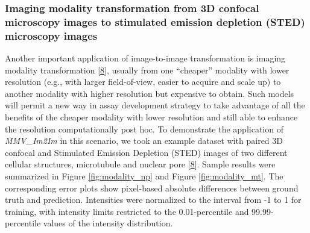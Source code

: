 \hypertarget{imaging-modality-transformation-from-3d-confocal-microscopy-images-to-stimulated-emission-depletion-sted-microscopy-images}{%
\subsubsection{Imaging modality transformation from 3D confocal microscopy images to stimulated emission depletion (STED) microscopy images}\label{imaging-modality-transformation-from-3d-confocal-microscopy-images-to-stimulated-emission-depletion-sted-microscopy-images}}

Another important application of image-to-image transformation is imaging modality transformation {[}\protect\hyperlink{ref-UEBDZ3tI}{8}{]}, usually from one ``cheaper'' modality with lower resolution (e.g., with larger field-of-view, easier to acquire and scale up) to another modality with higher resolution but expensive to obtain. Such models will permit a new way in assay development strategy to take advantage of all the benefits of the cheaper modality with lower resolution and still able to enhance the resolution computationally post hoc. To demonstrate the application of \emph{MMV\_Im2Im} in this scenario, we took an example dataset with paired 3D confocal and Stimulated Emission Depletion (STED) images of two different cellular structures, microtubule and nuclear pore {[}\protect\hyperlink{ref-UEBDZ3tI}{8}{]}. Sample results were summarized in Figure \ref{fig:modality_np} and Figure \ref{fig:modality_mt}. The corresponding error plots show pixel-based absolute differences between ground truth and prediction. Intensities were normalized to the interval from -1 to 1 for training, with intensity limits restricted to the 0.01-percentile and 99.99-percentile values of the intensity distribution.

